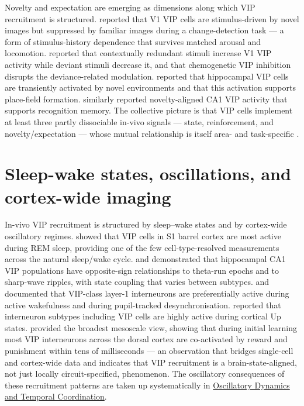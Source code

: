 \documentclass[11pt]{article}
\begin{document}
Novelty and expectation are emerging as dimensions along which VIP recruitment is structured. \citet{Garrett2020} reported that V1 VIP cells are stimulus-driven by novel images but suppressed by familiar images during a change-detection task --- a form of stimulus-history dependence that survives matched arousal and locomotion. \citet{Bastos2023a} reported that contextually redundant stimuli increase V1 VIP activity while deviant stimuli decrease it, and that chemogenetic VIP inhibition disrupts the deviance-related modulation. \citet{Neubrandt2025a} reported that hippocampal VIP cells are transiently activated by novel environments and that this activation supports place-field formation. \citet{Tamboli2024} similarly reported novelty-aligned CA1 VIP activity that supports recognition memory. The collective picture is that VIP cells implement at least three partly dissociable in-vivo signals --- state, reinforcement, and novelty/expectation --- whose mutual relationship is itself area- and task-specific \citep{Garrett2020, Bastos2023a, Neubrandt2025a, Tamboli2024, Pi2013}.

\section{Sleep-wake states, oscillations, and cortex-wide imaging}

In-vivo VIP recruitment is structured by sleep--wake states and by cortex-wide oscillatory regimes. \citet{Brecier2022} showed that VIP cells in S1 barrel cortex are most active during REM sleep, providing one of the few cell-type-resolved measurements across the natural sleep/wake cycle. \citet{Francavilla2018a} and \citet{Luo2020} demonstrated that hippocampal CA1 VIP populations have opposite-sign relationships to theta-run epochs and to sharp-wave ripples, with state coupling that varies between subtypes. \citet{Munoz2017} and \citet{Reimer2014} documented that VIP-class layer-1 interneurons are preferentially active during active wakefulness and during pupil-tracked desynchronisation. \citet{Neske2016} reported that interneuron subtypes including VIP cells are highly active during cortical Up states. \citet{Szadai2022} provided the broadest mesoscale view, showing that during initial learning most VIP interneurons across the dorsal cortex are co-activated by reward and punishment within tens of milliseconds --- an observation that bridges single-cell and cortex-wide data and indicates that VIP recruitment is a brain-state-aligned, not just locally circuit-specified, phenomenon. The oscillatory consequences of these recruitment patterns are taken up systematically in \href{/oscillatory-dynamics}{Oscillatory Dynamics and Temporal Coordination}.
\end{document}
